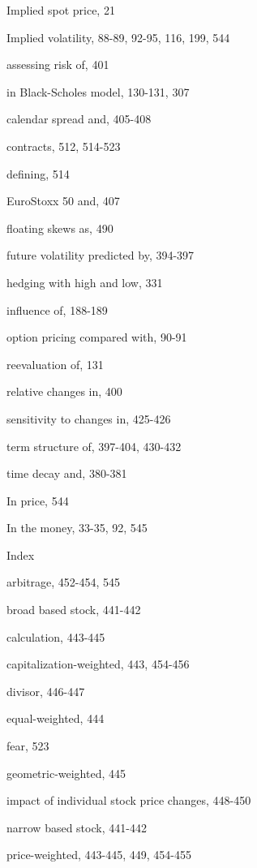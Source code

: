\noindent Implied spot price, 21\par
\noindent Implied volatility, 88-89, 92-95, 116, 199, 544\par
\noindent assessing risk of, 401\par
\noindent in Black-Scholes model, 130-131, 307\par
\noindent calendar spread and, 405-408\par
\noindent contracts, 512, 514-523\par
\noindent defining, 514\par
\noindent EuroStoxx 50 and, 407\par
\noindent floating skews as, 490\par
\noindent future volatility predicted by, 394-397\par
\noindent hedging with high and low, 331\par
\noindent influence of, 188-189\par
\noindent option pricing compared with, 90-91\par
\noindent reevaluation of, 131\par
\noindent relative changes in, 400\par
\noindent sensitivity to changes in, 425-426\par
\noindent term structure of, 397-404, 430-432\par
\noindent time decay and, 380-381\par
\noindent In price, 544\par
\noindent In the money, 33-35, 92, 545\par
\noindent Index\par
\noindent arbitrage, 452-454, 545\par
\noindent broad based stock, 441-442\par
\noindent calculation, 443-445\par
\noindent capitalization-weighted, 443, 454-456\par
\noindent divisor, 446-447\par
\noindent equal-weighted, 444\par
\noindent fear, 523\par
\noindent geometric-weighted, 445\par
\noindent impact of individual stock price changes, 448-450\par
\noindent narrow based stock, 441-442\par
\noindent price-weighted, 443-445, 449, 454-455\par

